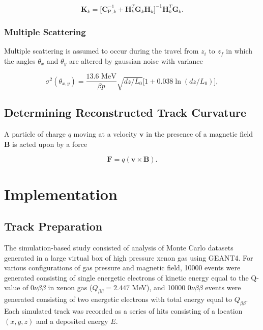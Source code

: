 \documentclass{JINST}
\begin{document}
\begin{equation}
\mathbf{K}_{k} = \bigl[\mathbf{C}_{\mathrm{P},k}^{-1} + \mathbf{H}_{k}^{T}\mathbf{G}_{k}\mathbf{H}_{k}\bigr]^{-1}\mathbf{H}_{k}^{T}\mathbf{G}_{k}.
\end{equation}

\subsubsection{Multiple Scattering}
Multiple scattering is assumed to occur during the travel from $z_{i}$ to $z_{f}$ in which the angles $\theta_{x}$ and $\theta_{y}$ are altered by gaussian noise with variance \cite{RPP_2012}

\begin{equation}
\sigma^{2}(\theta_{x,y}) = \frac{13.6\,\,\mathrm{MeV}}{\beta p}\sqrt{dz/L_{0}}\bigl[1 + 0.038\ln(dz/L_{0})\bigr],
\end{equation}

\subsection{Determining Reconstructed Track Curvature}\label{sec:curv}
A particle of charge $q$ moving at a velocity $\mathbf{v}$ in the presence of a magnetic field $\mathbf{B}$ is acted upon by a force

\begin{equation}
\mathbf{F} = q(\mathbf{v} \times \mathbf{B}).
\end{equation}



\section{Implementation}

\subsection{Track Preparation}\label{ssec:track}
The simulation-based study consisted of analysis of Monte Carlo datasets generated in a large virtual box of high pressure xenon gas using GEANT4.  For various configurations of gas pressure and magnetic field, 10000 events were generated consisting of single energetic electrons of kinetic energy equal to the Q-value of $0\nu\beta\beta$ in xenon gas ($Q_{\beta\beta} = 2.447$ MeV), and 10000 $0\nu\beta\beta$ events were generated consisting of two energetic electrons with total energy equal to $Q_{\beta\beta}$.  Each simulated track was recorded as a series of hits consisting of a location $(x,y,z)$ and a deposited energy $E$.  
\end{document}
